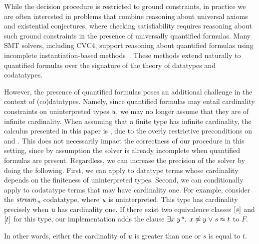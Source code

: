 
While the decision procedure is restricted to ground constraints,
in practice we are often interested in problems that combine reasoning about universal axioms and existential conjectures,
where checking satisfiability requires reasoning about such ground constraints in the presence of universally quantified formulas.
Many SMT solvers, including CVC4, support reasoning about quantified formulas using incomplete instantiation-based methods~\cite{MouraBjoerner07,ReynoldsTinelliMoura14}.
These methods extend naturally to quantified formulas over the signature of the theory of datatypes and codatatypes.

However, the presence of quantified formulas poses an additional challenge in the context of (co)datatypes.
Namely, since quantified formulas may entail cardinality constraints on uninterpreted types $\textit{u}$,
we may no longer assume that they are of infinite cardinality.
When assuming that a finite type has infinite cardinality, the calculus presented in this paper is ,
due to the overly restrictive preconditions on  and .
This does not necessarily impact the correctness of our procedure in this setting,
since by assumption the solver is already incomplete when quantified formulas are present.
Regardless, we can increase the precision of the solver by doing the following.
First, we can apply  to datatype terms whose cardinality depends on the finiteness of uninterpreted types.
Second, we can conditionally apply  to codatatype terms that may have cardinality one.
For example, consider the $\textit{stream}_{\,\textit{u}}$ codatatype, where $\textit{u}$ is uninterpreted.
This type has cardinality precisely when $\textit{u}$ has cardinality one.
If there exist two equivalence classes $[s]$ and $[t]$ for this type,
our implementation adds the clause %
$\exists x\;y\typ{\ty{u}}.\;\, x \not\teq y \mathrel\vee s \teq t$ to $F$.
\begin{rep}In other words, either the cardinality of $\textit{u}$ is greater than one or $s$ is equal to $t$.\end{rep}

